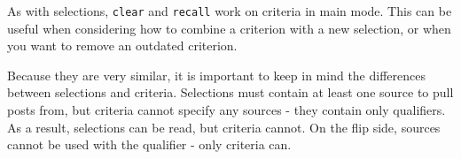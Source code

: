 As with selections, \texttt{clear} and \texttt{recall} work on criteria in main mode. This can be useful when
considering how to combine a criterion with a new selection, or when you want to remove an
outdated criterion.

Because they are very similar, it is important to keep in mind the differences between selections and criteria. Selections must contain at least one source to pull posts from, but criteria cannot specify any sources - they contain only qualifiers. As a result, selections can be read, but criteria cannot. On the flip side, sources cannot be used with the  qualifier - only criteria can.
